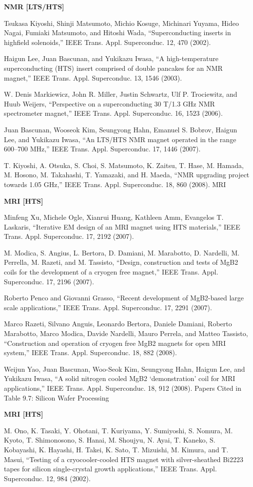 \noindent \textbf{NMR [LTS/HTS]}

\noindent [9.376] Tsukasa Kiyoshi, Shinji Matsumoto, Michio Kosuge, Michinari Yuyama, Hideo
Nagai, Fumiaki Matsumoto, and Hitoshi Wada, ``Superconducting inserts in highfield
solenoids,” IEEE Trans. Appl. Superconduc. 12, 470 (2002).

\noindent [9.377] Haigun Lee, Juan Bascunan, and Yukikazu Iwasa, ``A high-temperature superconducting
(HTS) insert comprised of double pancakes for an NMR magnet,” IEEE
Trans. Appl. Superconduc. 13, 1546 (2003).

\noindent [9.378] W. Denis Markiewicz, John R. Miller, Justin Schwartz, Ulf P. Trociewitz, and
Huub Weijers, ``Perspective on a superconducting 30 T/1.3 GHz NMR spectrometer
magnet,” IEEE Trans. Appl. Superconduc. 16, 1523 (2006).

\noindent [9.379] Juan Bascunan, Wooseok Kim, Seungyong Hahn, Emanuel S. Bobrov, Haigun
Lee, and Yukikazu Iwasa, ``An LTS/HTS NMR magnet operated in the range
600–700 MHz,” IEEE Trans. Appl. Superconduc. 17, 1446 (2007).

\noindent [9.380] T. Kiyoshi, A. Otsuka, S. Choi, S. Matsumoto, K. Zaitsu, T. Hase, M. Hamada,
M. Hosono, M. Takahashi, T. Yamazaki, and H. Maeda, ``NMR upgrading project
towards 1.05 GHz,” IEEE Trans. Appl. Superconduc. 18, 860 (2008).
MRI 

\noindent \textbf{MRI [HTS]}

\noindent [9.381] Minfeng Xu, Michele Ogle, Xianrui Huang, Kathleen Amm, Evangelos T. Laskaris,
``Iterative EM design of an MRI magnet using HTS materials,” IEEE Trans. Appl.
Superconduc. 17, 2192 (2007).

\noindent [9.382] M. Modica, S. Angius, L. Bertora, D. Damiani, M. Marabotto, D. Nardelli,
M. Perrella, M. Razeti, and M. Tassisto, ``Design, construction and tests of MgB2
coils for the development of a cryogen free magnet,” IEEE Trans. Appl. Superconduc.
17, 2196 (2007).

\noindent [9.383] Roberto Penco and Giovanni Grasso, ``Recent development of MgB2-based large
scale applications,” IEEE Trans. Appl. Superconduc. 17, 2291 (2007).

\noindent [9.384] Marco Razeti, Silvano Anguis, Leonardo Bertora, Daniele Damiani, Roberto
Marabotto, Marco Modica, Davide Nardelli, Mauro Perrela, and Matteo Tassisto,
``Construction and operation of cryogen free MgB2 magnets for open MRI
system,” IEEE Trans. Appl. Superconduc. 18, 882 (2008).

\noindent [9.385] Weijun Yao, Juan Bascunan, Woo-Seok Kim, Seungyong Hahn, Haigun Lee, and
Yukikazu Iwasa, ``A solid nitrogen cooled MgB2 ‘demonstration’ coil for MRI
applications,” IEEE Trans. Appl. Superconduc. 18, 912 (2008).
Papers Cited in Table 9.7: Silicon Wafer Processing 

\noindent \textbf{MRI [HTS]}

\noindent [9.386] M. Ono, K. Tasaki, Y. Ohotani, T. Kuriyama, Y. Sumiyoshi, S. Nomura, M. Kyoto,
T. Shimonosono, S. Hanai, M. Shoujyu, N. Ayai, T. Kaneko, S. Kobayashi,
K. Hayashi, H. Takei, K. Sato, T. Mizuishi, M. Kimura, and T. Masui, ``Testing
of a cryocooler-cooled HTS magnet with silver-sheathed Bi2223 tapes for silicon
single-crystal growth applications,” IEEE Trans. Appl. Superconduc. 12, 984
(2002).
